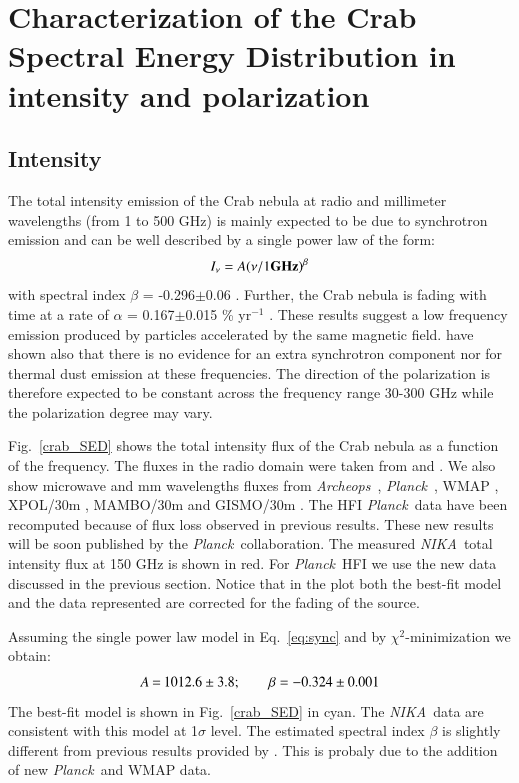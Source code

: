 \documentclass[twocolumn,traditabstract]{aa}
\def\NIKA{\textit{NIKA}}
\def\Archeops{\textit{Archeops}}
\def\Planck{\textit{Planck}}
\begin{document}
\section{Characterization of the Crab Spectral Energy Distribution in intensity and polarization}\label{sec:Polarization intensity Spectral Energy Density (SED)}
\subsection{Intensity}
The total intensity emission of the Crab nebula at radio and millimeter
wavelengths (from 1 to 500 GHz) is mainly expected to be due to synchrotron emission and can be
well described by a single power law of the form:
\begin{equation}
I_{\nu} = A(\nu / 1 {\bf GHz})^{\beta}
\end{equation}\label{eq:sync}
with spectral index $\beta$ = -0.296$\pm$0.06 \citep{baars1977absolute,macias2010}. Further, the Crab nebula is fading with time at a rate of $\alpha$ = 0.167$\pm$0.015 \% yr$^{-1}$ \citep{aller1985decrease}. 
These results suggest a low frequency emission produced by particles accelerated by the same magnetic field. \cite{macias2010} have shown also that there is no evidence for an extra synchrotron component nor for thermal dust emission at these frequencies. The direction of the polarization is therefore expected to be constant across the frequency range 30-300 GHz while the polarization degree may vary.

Fig.~\ref{crab_SED} shows the total intensity flux of the Crab nebula as a function of the frequency. The fluxes in the radio domain were taken from \cite{dmitrenko1970absolute} and \cite{1971IzVUZ..14..157V}. We also show microwave and mm wavelengths fluxes from  \Archeops\ \citep{macias2007archeops}, \Planck\ \citep{2015arXiv150702058P}, WMAP \citep{2011ApJS..192...19W}, XPOL/30m \citep{aumont2010}, MAMBO/30m \citep{2002A&A...386.1044B} and GISMO/30m \citep{2011ApJ...734...54A}. The HFI \Planck\ data have been recomputed because of flux loss observed in previous results. These new results will be soon published by the \Planck\ collaboration. The measured \NIKA\ total intensity flux at 150 GHz is shown in red. 
For \Planck\ HFI we use the new data discussed in the previous section.
Notice that in the plot both the best-fit model and the data represented are corrected for the fading of the source.

Assuming the single power law model in Eq.~\ref{eq:sync} and
by $\chi^2$-minimization we obtain:
$$\setlength\arraycolsep{0.1em}
 \begin{array}{rclcl}
  A&=& 1012.6\pm3.8 ; \quad \quad   \beta = -0.324\pm0.001\\
 \end{array}
$$
The best-fit model is shown in Fig.~\ref{crab_SED} in cyan.
The \NIKA\ data are consistent with this model at 1$\sigma$ level.
The estimated spectral index $\beta$ is slightly different from previous results provided by \cite{macias2010}. This 
is probaly due to the addition of new \Planck\ and  WMAP data.
\end{document}
